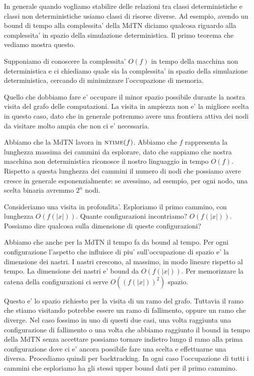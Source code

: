 
In generale quando vogliamo stabilire delle relazioni tra classi deterministiche e classi non
deterministiche usiamo classi di risorse diverse. Ad esempio, avendo un bound di tempo alla
complessita' della MdTN diciamo qualcosa riguardo alla complessita' in spazio della simulazione
deterministica. Il primo teorema che vediamo mostra questo.

Supponiamo di conoscere la complessita' $O(f)$ in tempo della macchina non deterministica e ci
chiediamo quale sia la complessita' in spazio della simulazione deterministica, cercando di
minimizzare l'occupazione di memoria.

Quello che dobbiamo fare e' occupare il minor spazio possibile durante la nostra visita del grafo
delle computazioni. La visita in ampiezza non e' la migliore scelta in questo caso, dato che in
generale potremmo avere una frontiera attiva dei nodi da visitare molto ampia che non ci e'
necessaria.

Abbiamo che la MdTN lavora in $\textsc{ntime}(f)$. Abbiamo che $f$ rappresenta la lunghezza massima dei
cammini da esplorare, dato che sappiamo che nostra macchina non deterministica riconosce il nostro
linguaggio in tempo $O(f)$. Rispetto a questa lunghezza dei cammini il numero di nodi che possiamo
avere cresce in generale esponenzialmente: se avessimo, ad esempio, per ogni nodo, una scelta
binaria avremmo $2^{n}$ nodi.

Consideriamo una visita in profondita'. Esploriamo il primo cammino, con lunghezza $O(f(|x|))$.
Quante configurazioni incontriamo? $O(f(|x|))$. Possiamo dire qualcosa sulla dimensione di queste
configurazioni? 

Abbiamo che anche per la MdTN il tempo fa da bound al tempo. Per ogni configurazione l'aspetto che
influisce di piu' sull'occupazione di spazio e' la dimensione dei nastri. I nastri crescono, al
massimo, in modo lineare rispetto al tempo. La dimensione dei nastri e' bound da $O(f(|x|))$. Per
memorizzare la catena della configurazioni ci serve $O((f(|x|))^{2})$ spazio. 

Questo e' lo spazio richiesto per la visita di un ramo del grafo. Tuttavia il ramo che stiamo
visitando potrebbe essere un ramo di fallimento, oppure un ramo che diverge. Nel caso fossimo in uno
di questi due casi, una volta raggiunta una configurazione di fallimento o una volta che abbiamo
raggiunto il bound in tempo della MdTN senza accettare possiamo tornare indietro lungo il ramo alla
prima configurazione dove ci e' ancora possibile fare una scelta e effettuarne una diversa.
Procediamo quindi per backtracking. In ogni caso l'occupazione di tutti i cammini che esploriamo ha
gli stessi upper bound dati per il primo cammino.

